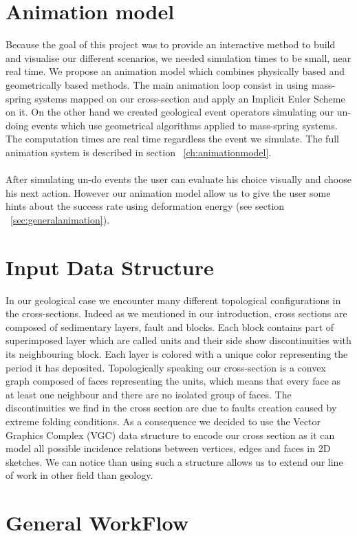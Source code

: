 \documentclass[12pt, a4paper]{report} %
\begin{document}
\section{Animation model}
Because the goal of this project was to provide an interactive method to build and visualise our different scenarios, we needed simulation times to be small, near real time. We propose an animation model which combines physically based and geometrically based methods. The main animation loop consist in using mass-spring systems mapped on our cross-section and apply an Implicit Euler Scheme on it. On the other hand we created geological event operators simulating our un-doing events which use geometrical algorithms applied to mass-spring systems. The computation times are real time regardless the event we simulate. The full animation system is described in section ~\ref{ch:animationmodel}.\\\\
After simulating un-do events the user can evaluate his choice visually and choose his next action. However our animation model allow us to give the user some hints about the success rate using deformation energy (see section ~\ref{sec:generalanimation}).
\section{Input Data Structure}
In our geological case we encounter many different topological configurations in the cross-sections. Indeed as we mentioned in our introduction, cross sections are composed of sedimentary layers, fault and blocks. Each block contains part of superimposed layer which are called units and their side show discontinuities with its neighbouring block. Each layer is colored with a unique color representing the period it has deposited. Topologically speaking our cross-section is a convex graph composed of faces representing the units, which means that every face as at least one neighbour and there are no isolated group of faces. The discontinuities we find in the cross section are due to faults creation caused by extreme folding conditions. As a consequence we decided to use the Vector Graphics Complex (VGC) \cite{vgc} data structure to encode our cross section as it can model all possible incidence relations between vertices, edges and faces in 2D sketches. We can notice than using such a structure allows us to extend our line of work in other field than geology.

\section{General WorkFlow}
\end{document}
